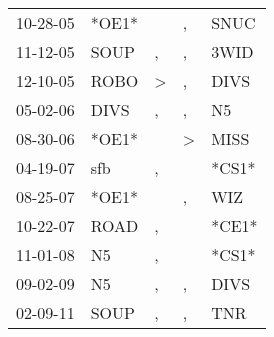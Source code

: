 \begin{supertabular}{lllll}
 10-28-05 &  *OE1* &               &             , &   SNUC \\
 11-12-05 &   SOUP &             , &             , &   3WID \\
 12-10-05 &   ROBO &  \textgreater &             , &   DIVS \\
 05-02-06 &   DIVS &             , &             , &     N5 \\
 08-30-06 &  *OE1* &               &  \textgreater &   MISS \\
 04-19-07 &    sfb &             , &               &  *CS1* \\
 08-25-07 &  *OE1* &               &             , &    WIZ \\
 10-22-07 &   ROAD &             , &               &  *CE1* \\
 11-01-08 &     N5 &             , &               &  *CS1* \\
 09-02-09 &     N5 &             , &             , &   DIVS \\
 02-09-11 &   SOUP &             , &             , &    TNR \\
\end{supertabular}
